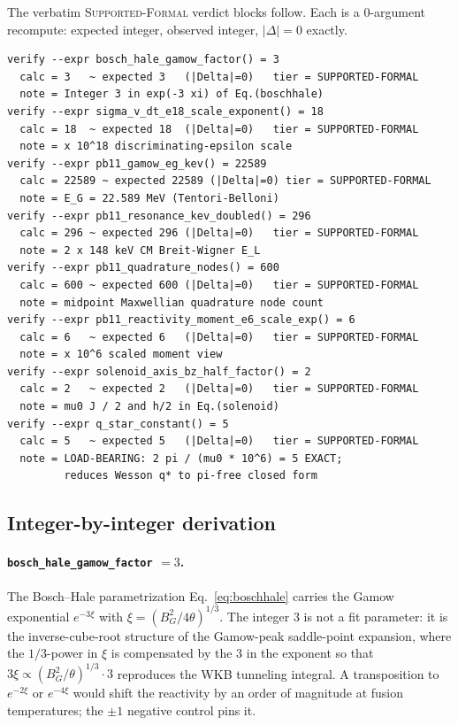 The verbatim \textsc{Supported-Formal} verdict blocks follow. Each is a
$0$-argument recompute: expected integer, observed integer, $|\Delta|=0$
exactly.
\begin{lstlisting}
verify --expr bosch_hale_gamow_factor() = 3
  calc = 3   ~ expected 3   (|Delta|=0)   tier = SUPPORTED-FORMAL
  note = Integer 3 in exp(-3 xi) of Eq.(boschhale)
verify --expr sigma_v_dt_e18_scale_exponent() = 18
  calc = 18  ~ expected 18  (|Delta|=0)   tier = SUPPORTED-FORMAL
  note = x 10^18 discriminating-epsilon scale
verify --expr pb11_gamow_eg_kev() = 22589
  calc = 22589 ~ expected 22589 (|Delta|=0) tier = SUPPORTED-FORMAL
  note = E_G = 22.589 MeV (Tentori-Belloni)
verify --expr pb11_resonance_kev_doubled() = 296
  calc = 296 ~ expected 296 (|Delta|=0)   tier = SUPPORTED-FORMAL
  note = 2 x 148 keV CM Breit-Wigner E_L
verify --expr pb11_quadrature_nodes() = 600
  calc = 600 ~ expected 600 (|Delta|=0)   tier = SUPPORTED-FORMAL
  note = midpoint Maxwellian quadrature node count
verify --expr pb11_reactivity_moment_e6_scale_exp() = 6
  calc = 6   ~ expected 6   (|Delta|=0)   tier = SUPPORTED-FORMAL
  note = x 10^6 scaled moment view
verify --expr solenoid_axis_bz_half_factor() = 2
  calc = 2   ~ expected 2   (|Delta|=0)   tier = SUPPORTED-FORMAL
  note = mu0 J / 2 and h/2 in Eq.(solenoid)
verify --expr q_star_constant() = 5
  calc = 5   ~ expected 5   (|Delta|=0)   tier = SUPPORTED-FORMAL
  note = LOAD-BEARING: 2 pi / (mu0 * 10^6) = 5 EXACT;
         reduces Wesson q* to pi-free closed form
\end{lstlisting}

\subsection{Integer-by-integer derivation}
\label{app:bluemax:derive}

\paragraph{\texttt{bosch\_hale\_gamow\_factor} $= 3$.}
The Bosch--Hale parametrization Eq.~\eqref{eq:boschhale} carries the Gamow
exponential $e^{-3\xi}$ with $\xi=(B_G^2/4\theta)^{1/3}$. The integer $3$ is
not a fit parameter: it is the inverse-cube-root structure of the
Gamow-peak saddle-point expansion, where the $1/3$-power in $\xi$ is
compensated by the $3$ in the exponent so that $3\xi \propto
(B_G^2/\theta)^{1/3}\cdot 3$ reproduces the WKB tunneling integral. A
transposition to $e^{-2\xi}$ or $e^{-4\xi}$ would shift the reactivity by an
order of magnitude at fusion temperatures; the $\pm1$ negative control pins it.

